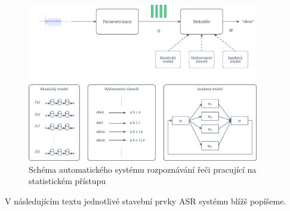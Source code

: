 \begin{figure}[hbpt]
  \centering
  \includegraphics[width=0.9\textwidth]{./ch4-asr/img/decoding.pdf}
  \caption{Schéma automatického systému rozpoznávání řeči pracující na statistickém přístupu}
  \label{fig:asr:decoding}
\end{figure}

V následujícím textu jednotlivé stavební prvky ASR systému blížš popíšeme.





% 




